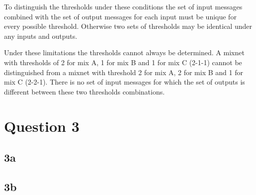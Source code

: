 \documentclass[a4paper,11pt]{article}
\begin{document}
To distinguish the thresholds under these conditions the set of input messages combined with the set of output messages for each input must be unique for every possible threshold. Otherwise two sets of thresholds may be identical under any inputs and outputs.

Under these limitations the thresholds cannot always be determined. A mixnet with thresholds of 2 for mix A, 1 for mix B and 1 for mix C (2-1-1) cannot be distinguished from a mixnet with threshold 2 for mix A, 2 for mix B and 1 for mix C (2-2-1). There is no set of input messages for which the set of outputs is different between these two thresholds combinations.

\section{Question 3}
\subsection{3a}
\subsection{3b}
\end{document}
